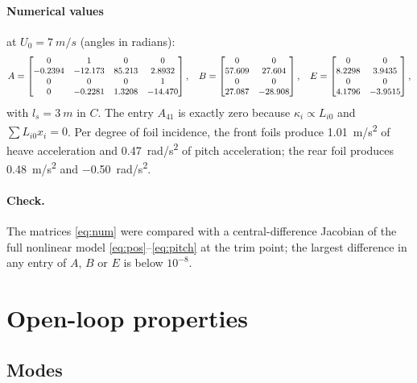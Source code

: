 \documentclass[11pt,a4paper]{article}
\begin{document}
\paragraph{Numerical values} at $U_0=\SI{7}{m/s}$ (angles in radians):
\begin{equation}
\small
A=\begin{bmatrix}
0 & 1 & 0 & 0\\
-0.2394 & -12.173 & 85.213 & 2.8932\\
0 & 0 & 0 & 1\\
0 & -0.2281 & 1.3208 & -14.470
\end{bmatrix},
\quad
B=\begin{bmatrix}
0 & 0\\ 57.609 & 27.604\\ 0 & 0\\ 27.087 & -28.908
\end{bmatrix},
\quad
E=\begin{bmatrix}
0 & 0\\ 8.2298 & 3.9435\\ 0 & 0\\ 4.1796 & -3.9515
\end{bmatrix},
\label{eq:num}
\end{equation}
with $l_s=\SI{3}{m}$ in $C$. The entry $A_{41}$ is exactly zero because
$\kappa_i\propto L_{i0}$ and $\sum L_{i0}x_i=0$. Per degree of foil incidence,
the front foils produce \SI{1.01}{m/s^2} of heave acceleration and
\SI{0.47}{rad/s^2} of pitch acceleration; the rear foil produces
\SI{0.48}{m/s^2} and \SI{-0.50}{rad/s^2}.

\paragraph{Check.} The matrices \eqref{eq:num} were compared with a
central-difference Jacobian of the full nonlinear model
\eqref{eq:pos}--\eqref{eq:pitch} at the trim point; the largest difference in
any entry of $A$, $B$ or $E$ is below $10^{-8}$.

\section{Open-loop properties}

\subsection{Modes}
\label{sec:modes}
\end{document}
